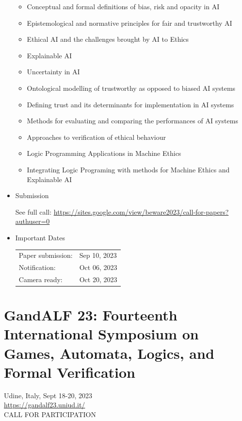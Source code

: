 \documentclass[prodmode,acmtecs]{acmsmall} %
\begin{document}
\begin{itemize}
\begin{itemize}\item  Conceptual and formal definitions of bias, risk and opacity in AI
\item  Epistemological and normative principles for fair and trustworthy AI
\item  Ethical AI and the challenges brought by AI to Ethics
\item  Explainable AI
\item  Uncertainty in AI
\item  Ontological modelling of trustworthy as opposed to biased AI systems
\item  Defining trust and its determinants for implementation in AI systems
\item  Methods for evaluating and comparing the performances of AI systems
\item  Approaches to verification of ethical behaviour
\item  Logic Programming Applications in Machine Ethics
\item  Integrating Logic Programing with methods for Machine Ethics and Explainable AI
\end{itemize} 
\item  Submission 
 
  See full call: \href{https://sites.google.com/view/beware2023/call-for-papers?authuser=0}{https://sites.google.com/view/beware2023/call-for-papers?authuser=0} 
 
\item  Important Dates 
 
\begin{tabulary}{\linewidth}{LL}Paper submission:  & Sep 10, 2023 \\
Notification:  & Oct 06, 2023 \\
Camera ready:  & Oct 20, 2023 \\
\end{tabulary}
 
\end{itemize}\section{GandALF 23: Fourteenth International Symposium on Games, Automata, Logics, and Formal Verification}\label{GandALF23}  Udine, Italy, Sept 18-20, 2023\\ 
  \href{https://gandalf23.uniud.it/}{https://gandalf23.uniud.it/}\\ 
CALL FOR PARTICIPATION 
\end{document}
